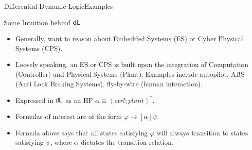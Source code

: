 \documentclass{beamer}
\newcommand{\dL}{\text{\upshape\textsf{d{\kern-0.05em}L}}}
\begin{document}
\begin{frame}{Differential Dynamic Logic}{Examples}
  \begin{block}{Some Intuition behind $\dL$}
  \begin{itemize}
    \item Generally, want to reason about Embedded Systems (ES) or Cyber Physical Systems (CPS).
      \pause
    \item Loosely speaking, an ES or CPS is built upon the integration of Computation (Controller) and
      Physical Systems (Plant). Examples include autopilot, ABS (Anti Lock
      Braking Systems), fly-by-wire (human interaction).
    \item Expressed in $\dL$ as an HP $\alpha \equiv (ctrl ; plant)^*$.
      \pause
    \item Formulas of interest are of the form $\varphi \to [\alpha]\psi$.
    \item Formula above says that all states satisfying $\varphi$ will
      always transition to states satisfying $\psi$, where $\alpha$ dictates
      the transition relation.
  \end{itemize}
\end{block}
\end{frame}
\end{document}
